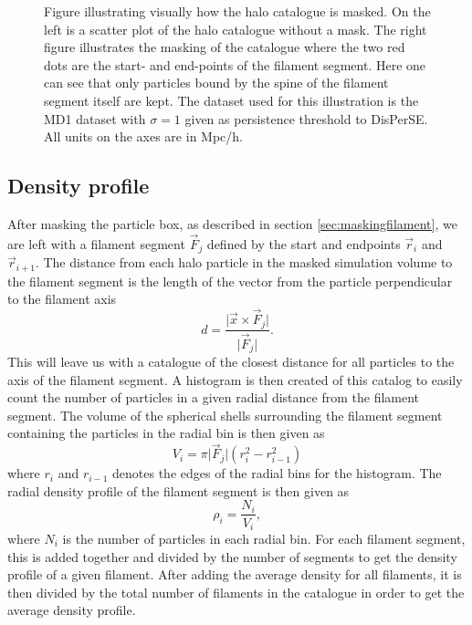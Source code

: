 \begin{figure}[htbp]
    \hspace{1em}%
    \caption{Figure illustrating visually how the halo catalogue is masked. On the left is a scatter plot of the halo catalogue without a mask. The right figure illustrates the masking of the catalogue where the two red dots are the start- and end-points of the filament segment. Here one can see that only particles bound by the spine of the filament segment itself are kept. The dataset used for this illustration is the MD1 dataset with $\sigma=1$ given as persistence threshold to DisPerSE. All units on the axes are in Mpc/h.}
    \label{fig:galaxy_catbbox}
\end{figure}
\subsection{Density profile}\label{sec:filamentdensity}
After masking the particle box, as described in section \ref{sec:maskingfilament},
we are left with a filament segment $\vec{F}_j$ defined by the start and
endpoints $\vec{r}_{i}$ and $\vec{r}_{i+1}$. The distance from each halo particle in
the masked simulation volume to the filament segment is the length of the vector
from the particle perpendicular to the filament axis
\begin{equation}\label{eq:distance_from_filament}
    d=\frac{\vert \vec{x}\times\vec{F}_j\vert}{\vert \vec{F}_j\vert}.
\end{equation}
This will leave us with a catalogue of the closest distance for all particles to
the axis of the filament segment. A histogram is then created of this catalog
to easily count the number of particles in a given radial distance from the
filament segment. The volume of the spherical shells surrounding the filament segment
containing the particles in the radial bin is then given as
\begin{equation}
    V_i={\pi\vert \vec{F}_j\vert(r_i^2-r_{i-1}^2)}
\end{equation}
where $r_i$ and $r_{i-1}$ denotes the edges of the radial bins for the histogram.
The radial density profile of the filament segment is then given as
\begin{equation}
    \rho_i=\frac{N_i}{V_i},
\end{equation}
where $N_i$ is the number of particles in each radial bin. For each filament segment,
this is added together and divided by the number of segments to get the density profile of a given filament. After adding the average density for all filaments, it is then divided by the total number of filaments in the catalogue in order to get the average density profile.
